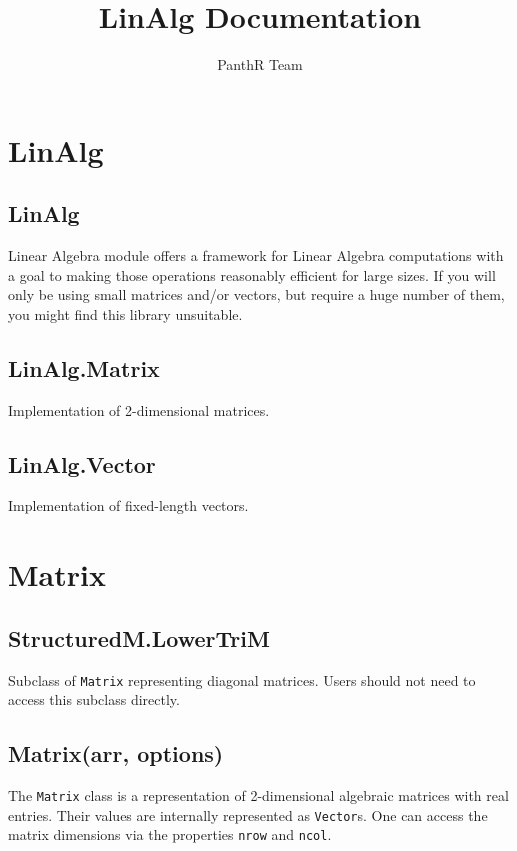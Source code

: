 \documentclass{article}
\title{LinAlg Documentation}
\author{PanthR Team}
\begin{document}
\maketitle

\tableofcontents

  \section{LinAlg}
    \subsection*{LinAlg}
    Linear Algebra module offers a framework for Linear Algebra computations
with a goal to making those operations reasonably efficient for large sizes.
If you will only be using small matrices and/or vectors, but require a huge
number of them, you might find this library unsuitable.


    \subsection*{LinAlg.Matrix}
    Implementation of 2-dimensional matrices.


    \subsection*{LinAlg.Vector}
    Implementation of fixed-length vectors.


  \section{Matrix}
    \subsection*{StructuredM.LowerTriM}
    Subclass of \texttt{Matrix} representing diagonal matrices.
Users should not need to access this subclass directly.


    \subsection*{Matrix(arr, options)}
    The \texttt{Matrix} class is a representation of 2-dimensional algebraic matrices
with real entries. Their values are internally represented as \texttt{Vector}s.
One can access the matrix dimensions via the properties \texttt{nrow} and \texttt{ncol}.
\end{document}
